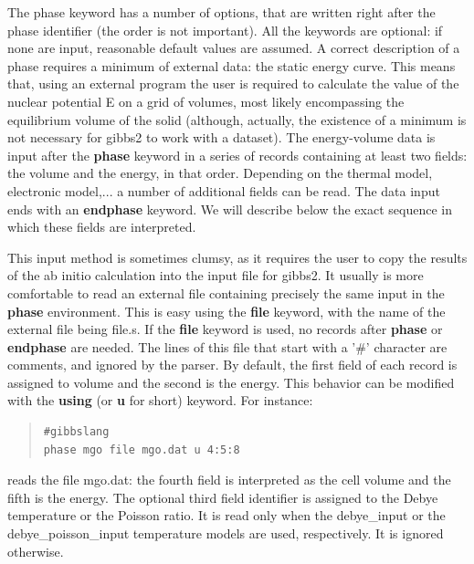 \documentclass[a4paper]{article}
\begin{document}
The phase keyword has a number of options, that are written right
after the phase identifier (the order is not important). All the
keywords are optional: if none are input, reasonable default values
are assumed. A correct description of a phase requires a minimum of
external data: the static energy curve. This means that, using an
external program the user is required to calculate the value of the
nuclear potential E on a grid of volumes, most likely encompassing the
equilibrium volume of the solid (although, actually, the existence of
a minimum is not necessary for gibbs2 to work with a dataset). The
energy-volume data is input after the \textbf{phase} keyword in a series of
records containing at least two fields: the volume and the energy, in
that order. Depending on the thermal model, electronic model,... a
number of additional fields can be read. The data input ends with an
\textbf{endphase} keyword. We will describe below the exact sequence in
which these fields are interpreted.

This input method is sometimes clumsy, as it requires the user to copy
the results of the ab initio calculation into the input file for
gibbs2. It usually is more comfortable to read an external file
containing precisely the same input in the \textbf{phase} environment. This
is easy using the \textbf{file} keyword, with the name of the external file
being file.s. If the \textbf{file} keyword is used, no records after
\textbf{phase} or \textbf{endphase} are needed. The lines of this file that
start with a '\#' character are comments, and ignored by the
parser. By default, the first field of each record is assigned to
volume and the second is the energy. This behavior can be modified
with the \textbf{using} (or \textbf{u} for short) keyword. For instance:
%
\begin{quote}
\begin{verbatim}
#gibbslang
phase mgo file mgo.dat u 4:5:8
\end{verbatim}
\end{quote}

reads the file mgo.dat: the fourth field is interpreted as the cell
volume and the fifth is the energy. The optional third field
identifier is assigned to the Debye temperature or the Poisson
ratio. It is read only when the debye\_input or the debye\_poisson\_input
temperature models are used, respectively. It is ignored otherwise.
\end{document}
